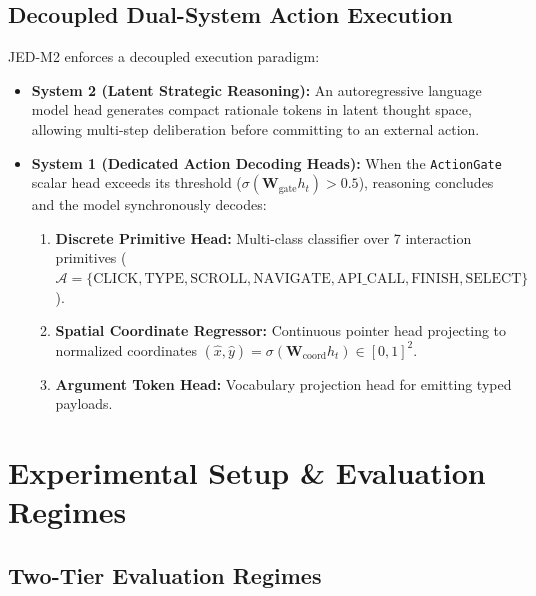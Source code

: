 \documentclass[10pt,twocolumn,letterpaper]{article}
\begin{document}
\subsection{Decoupled Dual-System Action Execution}

JED-M2 enforces a decoupled execution paradigm:
\begin{itemize}[leftmargin=*]
    \item \textbf{System 2 (Latent Strategic Reasoning):} An autoregressive language model head generates compact rationale tokens in latent thought space, allowing multi-step deliberation before committing to an external action.
    \item \textbf{System 1 (Dedicated Action Decoding Heads):} When the \texttt{ActionGate} scalar head exceeds its threshold ($\sigma(\mathbf{W}_{\text{gate}} h_t) > 0.5$), reasoning concludes and the model synchronously decodes:
    \begin{enumerate}[leftmargin=*]
        \item \textbf{Discrete Primitive Head:} Multi-class classifier over 7 interaction primitives ($\mathcal{A} = \{\text{CLICK}, \text{TYPE}, \text{SCROLL}, \text{NAVIGATE}, \text{API\_CALL}, \text{FINISH}, \text{SELECT}\}$).
        \item \textbf{Spatial Coordinate Regressor:} Continuous pointer head projecting to normalized coordinates $(\hat{x}, \hat{y}) = \sigma(\mathbf{W}_{\text{coord}} h_t) \in [0, 1]^2$.
        \item \textbf{Argument Token Head:} Vocabulary projection head for emitting typed payloads.
    \end{enumerate}
\end{itemize}

\section{Experimental Setup \& Evaluation Regimes}
\label{sec:experiments}

\subsection{Two-Tier Evaluation Regimes}
\end{document}
